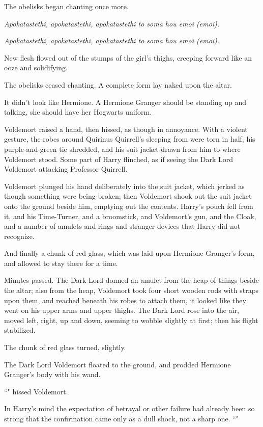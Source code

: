 The obelisks began chanting once more.

\emph{Apokatastethi, apokatastethi, apokatastethi to soma hou emoi (emoi).}

\emph{Apokatastethi, apokatastethi, apokatastethi to soma hou emoi (emoi).}

New flesh flowed out of the stumps of the girl's thighs, creeping forward like an ooze and solidifying.

The obelisks ceased chanting. A complete form lay naked upon the altar.

It didn't look like Hermione. A Hermione Granger should be standing up and talking, she should have her Hogwarts uniform.

Voldemort raised a hand, then hissed, as though in annoyance. With a violent gesture, the robes around Quirinus Quirrell's sleeping from were torn in half, his purple-and-green tie shredded, and his suit jacket drawn from him to where Voldemort stood. Some part of Harry flinched, as if seeing the Dark Lord Voldemort attacking Professor Quirrell.

Voldemort plunged his hand deliberately into the suit jacket, which jerked as though something were being broken; then Voldemort shook out the suit jacket onto the ground beside him, emptying out the contents. Harry's pouch fell from it, and his Time-Turner, and a broomstick, and Voldemort's gun, and the Cloak, and a number of amulets and rings and stranger devices that Harry did not recognize.

And finally a chunk of red glass, which was laid upon Hermione Granger's form, and allowed to stay there for a time.

Minutes passed. The Dark Lord donned an amulet from the heap of things beside the altar; also from the heap, Voldemort took four short wooden rods with straps upon them, and reached beneath his robes to attach them, it looked like they went on his upper arms and upper thighs. The Dark Lord rose into the air, moved left, right, up and down, seeming to wobble slightly at first; then his flight stabilized.

The chunk of red glass turned, slightly.

The Dark Lord Voldemort floated to the ground, and prodded Hermione Granger's body with his wand.

``" hissed Voldemort.

In Harry's mind the expectation of betrayal or other failure had already been so strong that the confirmation came only as a dull shock, not a sharp one. ``"

